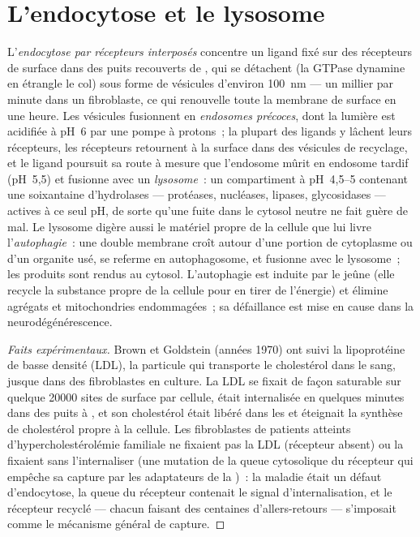 \section{L'endocytose et le lysosome}

\begin{definition}[L'endocytose]\label{def:b3:membrane-traffic:endocytosis}
L'\emph{endocytose par récepteurs interposés} concentre un ligand fixé
sur des récepteurs de surface dans des puits recouverts de ,
qui se détachent (la GTPase dynamine en étrangle le col) sous forme de
vésicules d'environ \qty{100}{nm} --- un millier par minute dans un
fibroblaste, ce qui renouvelle toute la membrane de surface en une
heure. Les vésicules fusionnent en \emph{endosomes précoces}, dont la
lumière est acidifiée à pH~6 par une pompe à protons~; la plupart des
ligands y lâchent leurs récepteurs, les récepteurs retournent à la
surface dans des vésicules de recyclage, et le ligand poursuit sa route
à mesure que l'endosome mûrit en endosome tardif (pH~5,5) et fusionne
avec un \emph{lysosome}~: un compartiment à pH~4,5--5 contenant une
soixantaine d'hydrolases --- protéases, nucléases, lipases,
glycosidases --- actives à ce seul pH, de sorte qu'une fuite dans le
cytosol neutre ne fait guère de mal. Le lysosome digère aussi le
matériel propre de la cellule que lui livre l'\emph{autophagie}~: une
double membrane croît autour d'une portion de cytoplasme ou d'un
organite usé, se referme en autophagosome, et fusionne avec le
lysosome~; les produits sont rendus au cytosol. L'autophagie est induite
par le jeûne (elle recycle la substance propre de la cellule pour en
tirer de l'énergie) et élimine agrégats et mitochondries endommagées~;
sa défaillance est mise en cause dans la neurodégénérescence.
\end{definition}

\begin{proof}[Faits expérimentaux]
Brown et Goldstein (années 1970) ont suivi la lipoprotéine de basse
densité (LDL), la particule qui transporte le cholestérol dans le sang,
jusque dans des fibroblastes en culture. La LDL se fixait de façon
saturable sur quelque \num{20000} sites de surface par cellule, était
internalisée en quelques minutes dans des puits à , et son
cholestérol était libéré dans les  et éteignait la synthèse de
cholestérol propre à la cellule. Les fibroblastes de patients atteints
d'hypercholestérolémie familiale ne fixaient pas la LDL (récepteur
absent) ou la fixaient sans l'internaliser (une mutation de la queue
cytosolique du récepteur qui empêche sa capture par les adaptateurs de
la )~: la maladie était un défaut d'endocytose, la queue du
récepteur contenait le signal d'internalisation, et le récepteur
recyclé --- chacun faisant des centaines d'allers-retours --- s'imposait
comme le mécanisme général de capture.
\end{proof}


